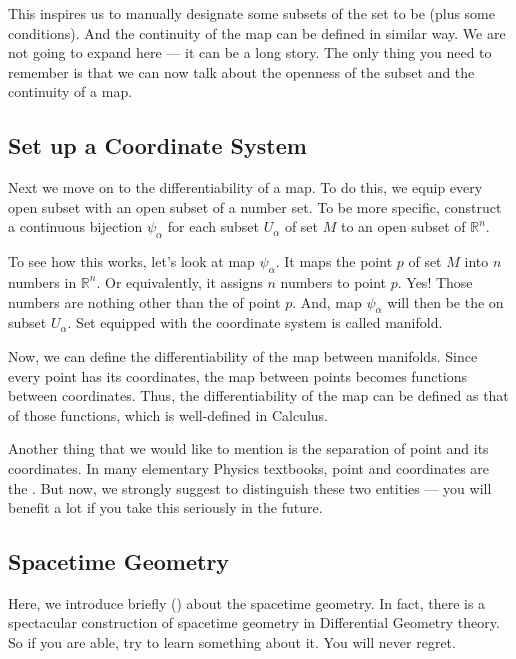 \documentclass[letterpaper,10pt,english]{sphinxmanual}
\begin{document}
This inspires us to manually designate some subsets of the set to be  (plus some conditions). And the continuity of the map can be defined in similar way. We are not going to expand here — it can be a long story. The only thing you need to remember is that we can now talk about the openness of the subset and the continuity of a map.


\subsection{Set up a Coordinate System}
\label{\detokenize{bg_diff_geo:set-up-a-coordinate-system}}
Next we move on to the differentiability of a map. To do this, we equip every open subset with an open subset of a number set. To be more specific, construct a continuous bijection \(\psi_\alpha\) for each subset \(U_\alpha\) of set \(M\) to an open subset of \(\mathbb R^n\).

To see how this works, let’s look at map \(\psi_\alpha\). It maps the point \(p\) of set \(M\) into \(n\) numbers in \(\mathbb R^n\). Or equivalently, it assigns \(n\) numbers to point \(p\). Yes! Those numbers are nothing other than the  of point \(p\). And, map \(\psi_\alpha\) will then be the  on subset \(U_\alpha\). Set equipped with the coordinate system is called manifold.

Now, we can define the differentiability of the map between manifolds. Since every point has its coordinates, the map between points becomes functions between coordinates. Thus, the differentiability of the map can be defined as that of those functions, which is well-defined in Calculus.

Another thing that we would like to mention is the separation of point and its coordinates. In many elementary Physics textbooks, point and coordinates are the . But now, we strongly suggest to distinguish these two entities — you will benefit a lot if you take this seriously in the future.


\subsection{Spacetime Geometry}
\label{\detokenize{bg_diff_geo:spacetime-geometry}}
Here, we introduce briefly () about the spacetime geometry. In fact, there is a spectacular construction of spacetime geometry in Differential Geometry theory. So if you are able, try to learn something about it. You will never regret.
\end{document}

